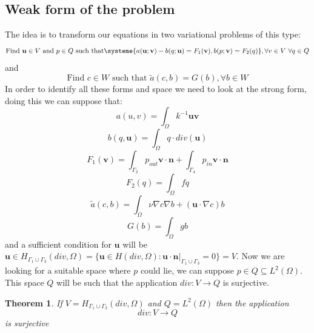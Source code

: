 \documentclass[]{report}
\newtheorem{theorem}{Theorem}
\begin{document}
\subsection{Weak form of the problem}\label{ContWF}
The idea is to transform our equations in two variational problems of this type:
\begin{equation}
	\mbox{Find }\mathbf{u}\in V\mbox{ and }p\in Q\mbox{ such that}
	\systeme{a(\mathbf{u};\mathbf{v})-b(q;\mathbf{u})=F_1(\mathbf{v}),b(p;\mathbf{v})=F_2(q)}
	,\forall v \in V \mbox{ } \forall q \in Q
	\label{mixed}
\end{equation}
and
\begin{equation}
	\mbox{Find }c\in W\mbox{ such that }
	\tilde{a}(c,b)=G(b), \forall b\in W
	\label{diff_transp}
\end{equation}
In order to identify all these forms and space we need to look at the strong form, doing this we can suppose that:
\begin{equation}
	a(u,v)=\int_\Omega k^{-1}\mathbf{u}\mathbf{v}
	\label{bil_a}
\end{equation}
\begin{equation}
	b(q,\mathbf{u})=\int_\Omega q\cdot div(\mathbf{u})
\end{equation}
\begin{equation}
F_1(\mathbf{v})=\int_{\Gamma_2} p_{out} \mathbf{v}\cdot \mathbf{n} +\int_{\Gamma_4} p_{in} \mathbf{v}\cdot \mathbf{n}
\end{equation}
\begin{equation}
F_2(q)=\int_\Omega fq
\end{equation}
\begin{equation}
\tilde{a}(c,b)=\int_\Omega \nu\nabla c\nabla b+(\mathbf{u}\cdot \nabla c) b
\label{a_tilde}
\end{equation}
\begin{equation}
G(b)=\int_\Omega gb
\label{G}
\end{equation}
  and a sufficient condition for $\mathbf{u}$ will be $\mathbf{u}\in H_{\Gamma_1\cup\Gamma_3}(div,\Omega)=\{\mathbf{u}\in H(div,\Omega):\mathbf{u}\cdot\mathbf{n}|_{\Gamma_1\cup\Gamma_3}=0\}=V$. Now we are looking for a suitable space where $p$ could lie, we can suppose $p \in Q\subseteq L^2(\Omega)$. This space $Q$ will be such that the application  $div:V\longrightarrow Q$ is surjective.
\begin{theorem}
	If $V=H_{\Gamma_1\cup\Gamma_3}(div,\Omega)$ and $Q=L^2(\Omega)$ then the application
	\begin{equation*}
	div:V\longrightarrow Q
	\end{equation*}
	is surjective
\end{theorem}
\end{document}
